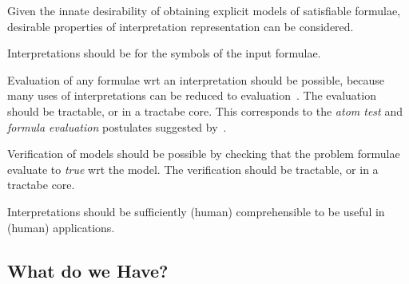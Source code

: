 \documentclass{easychair}
\newenvironment{packed_itemize}{
\vspace*{-0.3em}
\begin{itemize}
\setlength{\partopsep}{0pt}
\setlength{\itemsep}{1pt}
\setlength{\parskip}{0pt}
\setlength{\parsep}{0pt}
}{\end{itemize}}
\begin{document}
Given the innate desirability of obtaining explicit models of satisfiable formulae, desirable
properties of interpretation representation can be considered.
\begin{packed_itemize}
\item Interpretations should be for the symbols of the input formulae.
\item Evaluation of any formulae wrt an interpretation should be possible, because many uses of
      interpretations can be reduced to evaluation~\cite[\S3.2]{CLP04}.
      The evaluation should be tractable, or in a tractabe core.
      This corresponds to the \emph{atom test} and \emph{formula evaluation} postulates suggested
      by~\cite{FL96,CLP04}.
\item Verification of models should be possible by checking that the problem formulae evaluate 
      to \textit{true} wrt the model.
      The verification should be tractable, or in a tractabe core.
\item Interpretations should be sufficiently (human) comprehensible to be useful in (human)
      applications.
\end{packed_itemize}

\subsection{What do we Have?}
\label{Have}
\end{document}
